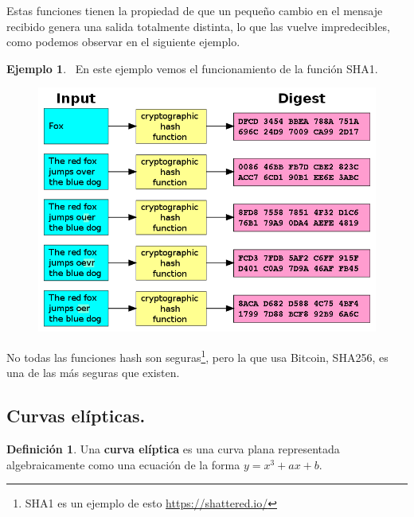 \documentclass[twoside]{article}
\theoremstyle{definition}
\newtheorem{defi}[teorema]{Definición}
\newtheorem{ej}[teorema]{Ejemplo}
\begin{document}
Estas funciones tienen la propiedad de que un pequeño cambio en el mensaje recibido genera una salida totalmente distinta, lo que las vuelve impredecibles, como podemos observar en el siguiente ejemplo.
	\newpage
\begin{ej}\
En este ejemplo vemos el funcionamiento de la función SHA1. 
\begin{figure}[h!]
\includegraphics[scale=0.4]{hashexample}
\end{figure}
\end{ej}

No todas las funciones hash son seguras\footnote{SHA1 es un ejemplo de esto \url{https://shattered.io/}}, pero la que usa Bitcoin, SHA256, es una de las más seguras que existen.

\newpage

\subsection{Curvas elípticas.}
\begin{defi}
Una \textbf{curva elíptica} es una curva plana representada algebraicamente como una ecuación de la forma $y=x^3+ax+b$. 
\end{defi}
\end{document}
